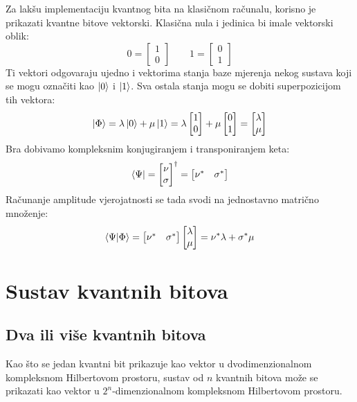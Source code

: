 Za lakšu implementaciju kvantnog bita na klasičnom računalu, korisno je prikazati kvantne bitove vektorski. Klasična nula i jedinica bi imale vektorski oblik:
\[
0 = \begin{bmatrix}
1 \\ 0
\end{bmatrix}
\qquad
1 = \begin{bmatrix}
0 \\ 1
\end{bmatrix}
\]
Ti vektori odgovaraju ujedno i vektorima stanja baze mjerenja nekog sustava koji se mogu označiti kao $\ket{0}$ i $\ket{1}$. Sva ostala stanja mogu se dobiti superpozicijom tih vektora:
\[
\ket{\Phi} = \lambda\ket{0} + \mu\ket{1} = \lambda\begin{bmatrix}
1 \\ 0
\end{bmatrix} + \mu\begin{bmatrix}
0 \\ 1
\end{bmatrix} = \begin{bmatrix}
\lambda \\ \mu
\end{bmatrix}
\]
Bra dobivamo kompleksnim konjugiranjem i transponiranjem keta:
\[
\bra{\Psi} = \begin{bmatrix}
\nu \\ \sigma
\end{bmatrix}^\dagger
= \begin{bmatrix}
\nu^* & \sigma^*
\end{bmatrix}
\]
Računanje amplitude vjerojatnosti se tada svodi na jednostavno matrično množenje:
\[
\braket{\Psi|\Phi} = \begin{bmatrix}
\nu^* & \sigma^*
\end{bmatrix}
\begin{bmatrix}
\lambda \\ \mu
\end{bmatrix} = \nu^*\lambda + \sigma^*\mu
\]



\section{Sustav kvantnih bitova}

\subsection{Dva ili više kvantnih bitova}
Kao što se jedan kvantni bit prikazuje kao vektor u dvodimenzionalnom kompleksnom Hilbertovom prostoru, sustav od $n$ kvantnih bitova može se prikazati kao vektor u $2^n$-dimenzionalnom kompleksnom Hilbertovom prostoru.

